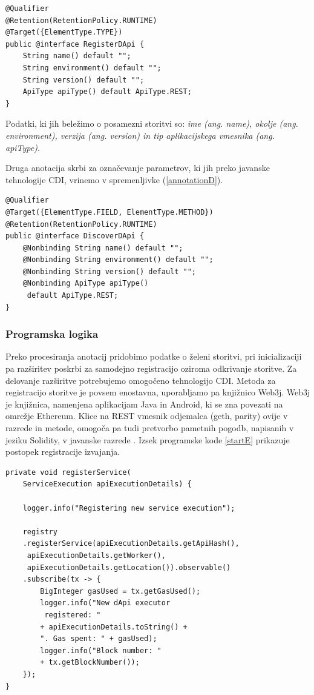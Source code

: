 \documentclass[a4paper, 12pt]{book}
\begin{document}
\begin{lstlisting}[caption={Anotacija za registracijo storitve},captionpos=b,label={annotationReg}]
@Qualifier
@Retention(RetentionPolicy.RUNTIME)
@Target({ElementType.TYPE})
public @interface RegisterDApi {
	String name() default "";
	String environment() default "";
	String version() default "";
	ApiType apiType() default ApiType.REST;
}
\end{lstlisting}

Podatki, ki jih beležimo o posamezni storitvi so: \textit{ime (ang. name), okolje (ang. environment), verzija (ang. version) in tip aplikacijskega vmesnika (ang. apiType)}.


Druga anotacija skrbi za označevanje parametrov, ki jih preko javanske tehnologije CDI, vrinemo v spremenljivke (\ref{annotationD}).

\begin{lstlisting}[caption={Anotacija za odkrivanje storitve},captionpos=b,label={annotationD}]
@Qualifier
@Target({ElementType.FIELD, ElementType.METHOD})
@Retention(RetentionPolicy.RUNTIME)
public @interface DiscoverDApi {
	@Nonbinding String name() default "";
	@Nonbinding String environment() default "";
	@Nonbinding String version() default "";
	@Nonbinding ApiType apiType()
	 default ApiType.REST;
}
\end{lstlisting}

\subsubsection{Programska logika}
Preko procesiranja anotacij pridobimo podatke o želeni storitvi, pri inicializaciji pa razširitev poskrbi za samodejno registracijo oziroma odkrivanje storitve.
Za delovanje razširitve potrebujemo omogočeno tehnologijo CDI.
Metoda za registracijo storitve je povsem enostavna, uporabljamo pa knjižnico Web3j.
Web3j je knjižnica, namenjena aplikacijam Java in Android, ki se zna povezati na omrežje Ethereum.
Klice na REST vmesnik odjemalca (geth, parity) ovije v razrede in metode, omogoča pa tudi pretvorbo pametnih pogodb, napisanih v jeziku Solidity, v javanske razrede \cite{web3j}.
Izsek programske kode \ref{startE} prikazuje postopek registracije izvajanja.

\begin{lstlisting}[caption={Funckija za registracijo izvajanja storitve},captionpos=b,label={startE}]
private void registerService(
	ServiceExecution apiExecutionDetails) {
	
	logger.info("Registering new service execution");
	
	registry
	.registerService(apiExecutionDetails.getApiHash(),
	 apiExecutionDetails.getWorker(),
	 apiExecutionDetails.getLocation()).observable()
	.subscribe(tx -> {
		BigInteger gasUsed = tx.getGasUsed();
		logger.info("New dApi executor
		 registered: "
	 	+ apiExecutionDetails.toString() + 
	 	". Gas spent: " + gasUsed);
		logger.info("Block number: "
	 	+ tx.getBlockNumber());
	});
}
\end{lstlisting}
\end{document}
